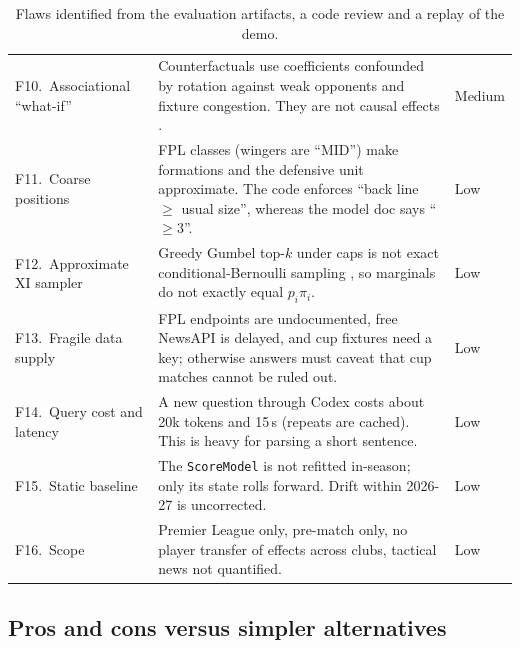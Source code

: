 \documentclass[11pt,a4paper]{article}
\newcommand{\code}[1]{\texttt{\small #1}}
\begin{document}
\begin{table}[p]
\begin{tabularx}{\linewidth}{@{}>{\raggedright\arraybackslash}p{3.6cm}X>{\centering\arraybackslash}p{1.4cm}@{}}
F10.~Associational ``what-if'' & Counterfactuals use coefficients confounded by rotation against weak opponents and fixture congestion. They are not causal effects \citep{hernan2020}. & Medium\\
F11.~Coarse positions & FPL classes (wingers are ``MID'') make formations and the defensive unit approximate. The code enforces ``back line $\ge$ usual size'', whereas the model doc says ``$\ge3$''. & Low\\
F12.~Approximate XI sampler & Greedy Gumbel top-$k$ under caps is not exact conditional-Bernoulli sampling \citep{chen1994}, so marginals do not exactly equal $p_i\pi_i$. & Low\\
F13.~Fragile data supply & FPL endpoints are undocumented, free NewsAPI is delayed, and cup fixtures need a key; otherwise answers must caveat that cup matches cannot be ruled out. & Low\\
F14.~Query cost and latency & A new question through Codex costs about 20k tokens and 15\,s (repeats are cached). This is heavy for parsing a short sentence. & Low\\
F15.~Static baseline & The \code{ScoreModel} is not refitted in-season; only its state rolls forward. Drift within 2026-27 is uncorrected. & Low\\
F16.~Scope & Premier League only, pre-match only, no player transfer of effects across clubs, tactical news not quantified. & Low\\
\bottomrule
\end{tabularx}
\caption{Flaws identified from the evaluation artifacts, a code review and a
replay of the demo.}
\label{tab:flaws}
\end{table}

\subsection{Pros and cons versus simpler alternatives}
\end{document}
